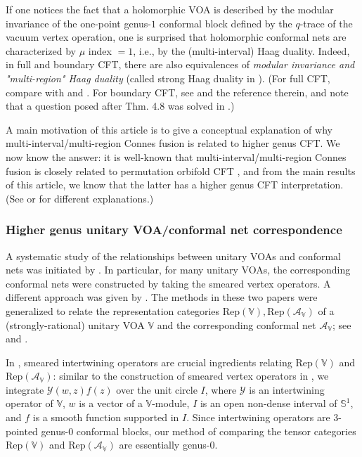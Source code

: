 \documentclass[11pt,b5paper,notitlepage]{article}
\theoremstyle{definition}
\theoremstyle{plain}
\newcommand{\mc}{\mathcal}
\newcommand{\Rep}{\mathrm{Rep}}
\newcommand{\mbb}{\mathbb}
\newcommand{\Vbb}{\mathbb V}
\numberwithin{equation}{subsection}
\begin{document}
If one notices the fact that a holomorphic VOA is described by the modular invariance of the one-point genus-$1$ conformal block defined by the $q$-trace of the vacuum vertex operation, one is surprised that holomorphic conformal nets are characterized by $\mu$ index $=1$, i.e., by the (multi-interval) Haag duality. Indeed, in full and boundary CFT, there are also equivalences of  \emph{modular invariance and "multi-region" Haag duality} (called strong Haag duality in \cite{Hen14}). (For full CFT, compare \cite[Prop. 6.6]{BKL15} with \cite[Thm. 5.7]{Kong08} and \cite[Thm. 3.4]{KR09a}. For boundary CFT, see \cite[Sec. 4]{KR09b} and the reference therein, and note that a question posed after Thm. 4.8 was solved in \cite[Prop. 4.18]{BKL15}.)


A main motivation of this article is to give a conceptual explanation of why multi-interval/multi-region Connes fusion is related to higher genus CFT. We now know the answer: it is well-known that multi-interval/multi-region Connes fusion is closely related to permutation orbifold CFT \cite{LX04,KLX05}, and from the main results of this article, we know that the latter has a higher genus CFT interpretation. (See \cite{BDH17} or \cite{LX19} for different explanations.)



\subsubsection*{Higher genus unitary VOA/conformal net correspondence}


A systematic study of the relationships between unitary VOAs and conformal nets was initiated by \cite{CKLW18}. In particular, for many unitary VOAs, the corresponding conformal nets were constructed by taking the smeared vertex operators. A different approach was given by \cite{Ten19a}. The methods in these two papers were generalized to relate the representation categories $\Rep(\Vbb),\Rep(\mc A_\Vbb)$ of a (strongly-rational) unitary VOA $\Vbb$ and the corresponding conformal net $\mc A_\Vbb$; see \cite{Ten19b,Ten19c} and \cite{Gui21,Gui20a}. 

In \cite{Gui21,Gui20a}, smeared intertwining operators are   crucial ingredients relating $\Rep(\Vbb)$ and $\Rep(\mc A_\Vbb)$: similar to the construction of smeared vertex operators in \cite{CKLW18}, we integrate $\mc Y(w,z)f(z)$ over the unit circle $I$, where $\mc Y$ is an intertwining operator of $\Vbb$, $w$ is a vector of a $\Vbb$-module, $I$ is an open non-dense interval of $\mbb S^1$, and $f$ is a smooth function supported in $I$. Since intertwining operators are $3$-pointed genus-$0$ conformal blocks, our method of comparing the tensor categories $\Rep(\Vbb)$ and $\Rep(\mc A_\Vbb)$ are essentially genus-$0$.
\end{document}
